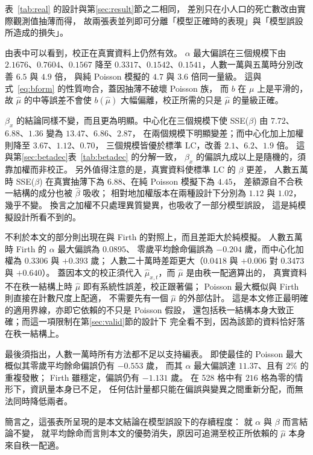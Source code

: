 \documentclass[UTF8, fontset=macnew, a4paper, 12pt]{ctexart}
\begin{document}
表~\ref{tab:real} 的設計與第\ref{sec:result}節之二相同，
差別只在小人口的死亡數改由實際觀測值抽薄而得，
故兩張表並列即可分離「模型正確時的表現」與「模型誤設所造成的損失」。

由表中可以看到，校正在真實資料上仍然有效。
$\alpha$ 最大偏誤在三個規模下由 $2.1676$、$0.7604$、$0.1567$
降至 $0.3317$、$0.1542$、$0.1541$，人數一萬與五萬時分別改善 $6.5$ 與 $4.9$ 倍，
與純 Poisson 模擬的 $4.7$ 與 $3.6$ 倍同一量級。
這與式~\eqref{eq:bform} 的性質吻合，蓋因抽薄不破壞 Poisson 族，
而 $b$ 在 $\mu$ 上是平滑的，故 $\hat\mu$ 的中等誤差不會使 $b(\hat\mu)$
大幅偏離，校正所需的只是 $\hat\mu$ 的量級正確。

$\beta_x$ 的結論同樣不變，而且更為明顯。中心化在三個規模下使
SSE($\beta$) 由 $7.72$、$6.88$、$1.36$ 變為 $13.47$、$6.86$、$2.87$，
在兩個規模下明顯變差；而中心化加上加權則降至 $3.67$、$1.12$、$0.70$，
三個規模皆優於標準 LC，改善 $2.1$、$6.2$、$1.9$ 倍。
這與第\ref{sec:betadec}表~\ref{tab:betadec} 的分解一致，
$\beta_x$ 的偏誤九成以上是隨機的，須靠加權而非校正。
另外值得注意的是，真實資料使標準 LC 的 $\beta$ 更差，
人數五萬時 SSE($\beta$) 在真實抽薄下為 $6.88$、在純 Poisson 模擬下為 $4.45$，
差額源自不合秩一結構的成分也被 $\hat\beta$ 吸收；
相對地加權版本在兩種設計下分別為 $1.12$ 與 $1.02$，幾乎不變。
換言之加權不只處理異質變異，也吸收了一部分模型誤設，
這是純模擬設計所看不到的。

不利於本文的部分則出現在與 Firth 的對照上，而且差距大於純模擬。
人數五萬時 Firth 的 $\alpha$ 最大偏誤為 $0.0895$、
零歲平均餘命偏誤為 $-0.204$ 歲，而中心化加權為 $0.3306$ 與 $+0.393$ 歲；
人數二十萬時差距更大（$0.0418$ 與 $+0.006$ 對 $0.3473$ 與 $+0.640$）。
蓋因本文的校正須代入 $\hat\mu_{x,t}$，而 $\hat\mu$ 是由秩一配適算出的，
真實資料不在秩一結構上時 $\hat\mu$ 即有系統性誤差，校正跟著偏；
Poisson 最大概似與 Firth 則直接在計數尺度上配適，
不需要先有一個 $\hat\mu$ 的外部估計。
這是本文修正最明確的適用界線，亦即它依賴的不只是 Poisson 假設，
還包括秩一結構本身大致正確；而這一項限制在第\ref{sec:valid}節的設計下
完全看不到，因為該節的資料恰好落在秩一結構上。

最後須指出，人數一萬時所有方法都不足以支持編表。
即使最佳的 Poisson 最大概似其零歲平均餘命偏誤仍有 $-0.553$ 歲，
而其 $\alpha$ 最大偏誤達 $11.37$、且有 $2\%$ 的重複發散；
Firth 雖穩定，偏誤仍有 $-1.131$ 歲。
在 528 格中有 $216$ 格為零的情形下，資訊量本身已不足，
任何估計量都只能在偏誤與變異之間重新分配，而無法同時降低兩者。

簡言之，這張表所呈現的是本文結論在模型誤設下的存續程度：
就 $\alpha$ 與 $\beta$ 而言結論不變，
就平均餘命而言則本文的優勢消失，原因可追溯至校正所依賴的 $\hat\mu$
本身來自秩一配適。
\end{document}

